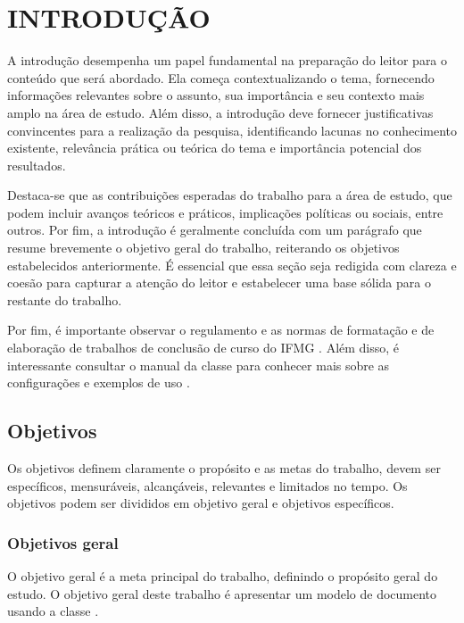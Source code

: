 \documentclass[dissertacao]{iftex2024}
\begin{document}
\maketitle

\chapter{INTRODUÇÃO}

A introdução desempenha um papel fundamental na preparação do leitor para o conteúdo que será abordado.
Ela começa contextualizando o tema, fornecendo informações relevantes sobre o assunto, sua importância e seu contexto mais amplo na área de estudo.
Além disso, a introdução deve fornecer justificativas convincentes para a realização da pesquisa, identificando lacunas no conhecimento existente, relevância prática ou teórica do tema e importância potencial dos resultados.

Destaca-se que as contribuições esperadas do trabalho para a área de estudo, que podem incluir avanços teóricos e práticos, implicações políticas ou sociais, entre outros.
Por fim, a introdução é geralmente concluída com um parágrafo que resume brevemente o objetivo geral do trabalho, reiterando os objetivos estabelecidos anteriormente.
É essencial que essa seção seja redigida com clareza e coesão para capturar a atenção do leitor e estabelecer uma base sólida para o restante do trabalho.

Por fim, é importante observar o regulamento e as normas de formatação e de elaboração de trabalhos de conclusão de curso do IFMG \cite{ifmg:2020:manual,ifmg:2021:tcc}.
Além disso, é interessante consultar o manual da classe \iftex para conhecer mais sobre as configurações e exemplos de uso \cite{ribeiro:2024:iftex}.

\section{Objetivos}

Os objetivos definem claramente o propósito e as metas do trabalho, devem ser específicos, mensuráveis, alcançáveis, relevantes e limitados no tempo.
Os objetivos podem ser divididos em objetivo geral e objetivos específicos.

\subsection{Objetivos geral}

O objetivo geral é a meta principal do trabalho, definindo o propósito geral do estudo.
O objetivo geral deste trabalho é apresentar um modelo de documento usando a classe \iftex.
\end{document}
